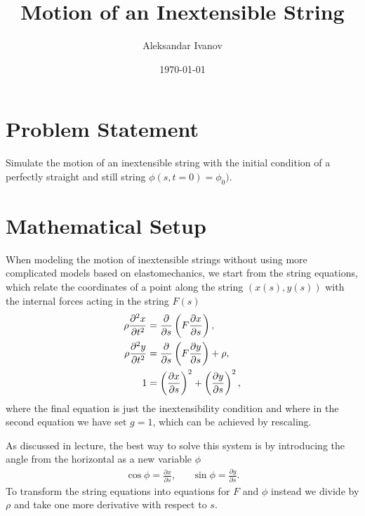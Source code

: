 \documentclass[10pt,a4paper,twocolumn]{article}
\begin{document}
\title{Motion of an Inextensible String}
\author{Aleksandar Ivanov}
\date{\today}
\maketitle

\section{Problem Statement}

Simulate the motion of an inextensible string with the initial condition of a perfectly straight and still string $\phi(s,t=0) = \phi_0)$.


\section{Mathematical Setup}

When modeling the motion of inextensible strings without using more complicated models based on elastomechanics, we start from the string equations, which relate the coordinates of a point along the string $(x(s), y(s))$ with the internal forces acting in the string $F(s)$
%
\begin{align}
    \rho \frac{\partial^2 x}{\partial t^2} &= \frac{\partial}{\partial s} \left( F \frac{\partial x}{\partial s} \right), \notag\\
    \rho \frac{\partial^2 y}{\partial t^2} &= \frac{\partial}{\partial s} \left( F \frac{\partial y}{\partial s} \right) + \rho, \notag\\
    1 &= \left( \frac{\partial x}{\partial s} \right)^2 + \left( \frac{\partial y}{\partial s} \right)^2,
\end{align}
%
where the final equation is just the inextensibility condition and where in the second equation we have set $g=1$, which can be achieved by rescaling.

As discussed in lecture, the best way to solve this system is by introducing the angle from the horizontal as a new variable $\phi$
%
\begin{align}
    &\cos \phi = \frac{\partial x}{\partial s},& &\sin \phi = \frac{\partial y}{\partial s}.&
\end{align}
%
To transform the string equations into equations for $F$ and $\phi$ instead we divide by $\rho$ and take one more derivative with respect to $s$.
\end{document}
